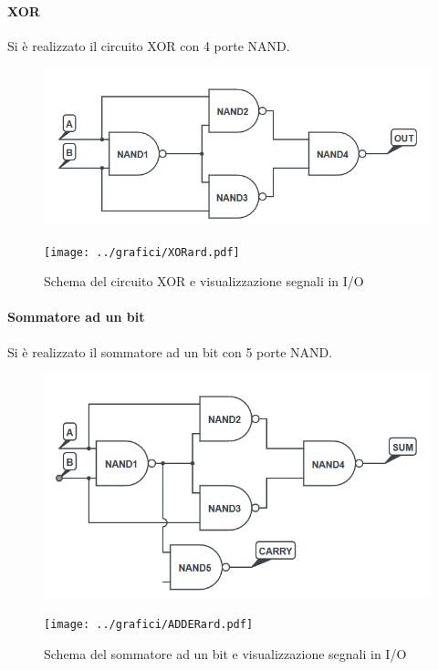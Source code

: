 \documentclass[a4paper,10pt]{article}
\begin{document}
\paragraph{XOR} Si è realizzato il circuito XOR con 4 porte NAND.

\begin{figure}[H]
	\centering
	\begin{minipage}{0.49\textwidth}
		\centering
		\includegraphics[width=\textwidth]{../grafici/XOR1.png}
	\end{minipage}
	\begin{minipage}{0.49\textwidth}
		\centering
		\texttt{[image: ../grafici/XORard.pdf]}
	\end{minipage}
	\caption{Schema del circuito XOR e visualizzazione segnali in I/O}
	\label{fig:XOR}
\end{figure}


\paragraph{Sommatore ad un bit} Si è realizzato il sommatore ad un bit con 5 porte NAND.

\begin{figure}[H]
	\centering
	\begin{minipage}{0.49\textwidth}
		\centering
		\includegraphics[width=\textwidth]{../grafici/Sommatore1.png}
	\end{minipage}
	\begin{minipage}{0.49\textwidth}
		\centering
		\texttt{[image: ../grafici/ADDERard.pdf]}
	\end{minipage}
	\caption{Schema del sommatore ad un bit e visualizzazione segnali in I/O}
	\label{fig:ADDER}
\end{figure}
\end{document}
